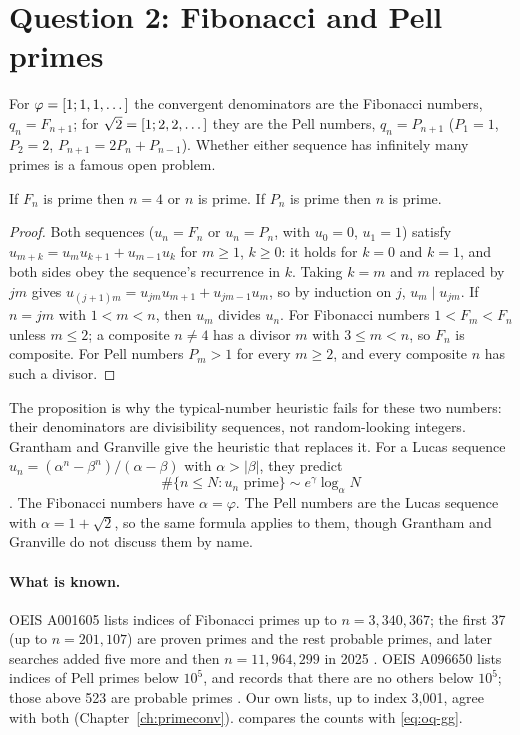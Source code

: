 \section{Question 2: Fibonacci and Pell primes}\label{sec:oq2}

For $\varphi = [1; 1, 1, \dots]$ the convergent denominators are the Fibonacci numbers, $q_n = F_{n+1}$; for $\sqrt 2 = [1; 2, 2, \dots]$ they are the Pell numbers, $q_n = P_{n+1}$ ($P_1 = 1$, $P_2 = 2$, $P_{n+1} = 2P_n + P_{n-1}$). Whether either sequence has infinitely many primes is a famous open problem.

\begin{proposition}[classical]\label{prop:oq-fib}
If $F_n$ is prime then $n = 4$ or $n$ is prime. If $P_n$ is prime then $n$ is prime.
\end{proposition}

\begin{proof}
Both sequences ($u_n = F_n$ or $u_n = P_n$, with $u_0 = 0$, $u_1 = 1$) satisfy $u_{m+k} = u_m u_{k+1} + u_{m-1}u_k$ for $m \ge 1$, $k \ge 0$: it holds for $k = 0$ and $k = 1$, and both sides obey the sequence's recurrence in $k$. Taking $k = m$ and $m$ replaced by $jm$ gives $u_{(j+1)m} = u_{jm}u_{m+1} + u_{jm-1}u_m$, so by induction on $j$, $u_m \mid u_{jm}$. If $n = jm$ with $1 < m < n$, then $u_m$ divides $u_n$. For Fibonacci numbers $1 < F_m < F_n$ unless $m \le 2$; a composite $n \ne 4$ has a divisor $m$ with $3 \le m < n$, so $F_n$ is composite. For Pell numbers $P_m > 1$ for every $m \ge 2$, and every composite $n$ has such a divisor.
\end{proof}

The proposition is why the typical-number heuristic fails for these two numbers: their denominators are divisibility sequences, not random-looking integers. Grantham and Granville give the heuristic that replaces it. For a Lucas sequence $u_n = (\alpha^n - \beta^n)/(\alpha - \beta)$ with $\alpha > |\beta|$, they predict
\begin{equation}\label{eq:oq-gg}
  \#\{n \le N : u_n \text{ prime}\} \sim e^{\gamma}\log_\alpha N
\end{equation}
\citep{GranthamGranville2024}. The Fibonacci numbers have $\alpha = \varphi$. The Pell numbers are the Lucas sequence with $\alpha = 1 + \sqrt 2$, so the same formula applies to them, though Grantham and Granville do not discuss them by name.

\paragraph{What is known.} OEIS A001605 lists \OqFibCount{} indices of Fibonacci primes up to $n = 3{,}340{,}367$; the first 37 (up to $n = 201{,}107$) are proven primes and the rest probable primes, and later searches added five more and then $n = 11{,}964{,}299$ in 2025 \citep{OEIS_A001605}. OEIS A096650 lists \OqPellCount{} indices of Pell primes below $10^5$, and records that there are no others below $10^5$; those above 523 are probable primes \citep{OEIS_A096650}. Our own lists, up to index 3{,}001, agree with both (Chapter~\ref{ch:primeconv}).  compares the counts with \eqref{eq:oq-gg}.

